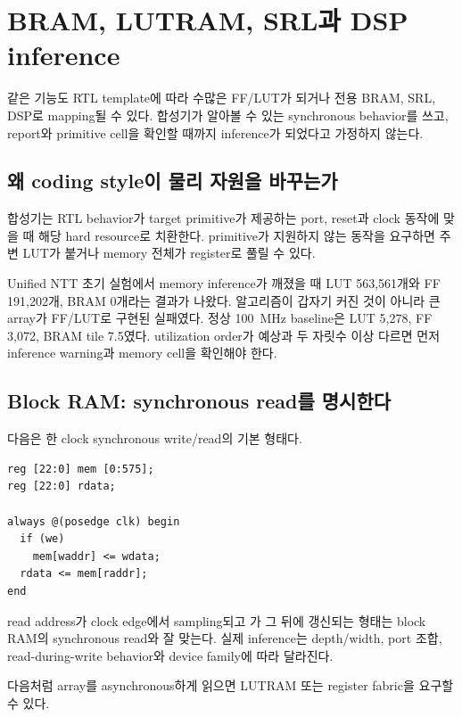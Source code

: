 \chapter{BRAM, LUTRAM, SRL과 DSP inference}

\begin{summarybox}[Inference의 의미]
같은 기능도 RTL template에 따라 수많은 FF/LUT가 되거나 전용 BRAM, SRL, DSP로
mapping될 수 있다. 합성기가 알아볼 수 있는 synchronous behavior를 쓰고, report와
primitive cell을 확인할 때까지 inference가 되었다고 가정하지 않는다.
\end{summarybox}

\section{왜 coding style이 물리 자원을 바꾸는가}

합성기는 RTL behavior가 target primitive가 제공하는 port, reset과 clock 동작에
맞을 때 해당 hard resource로 치환한다. primitive가 지원하지 않는 동작을 요구하면
주변 LUT가 붙거나 memory 전체가 register로 풀릴 수 있다.

Unified NTT 초기 실험에서 memory inference가 깨졌을 때 LUT 563,561개와 FF
191,202개, BRAM 0개라는 결과가 나왔다. 알고리즘이 갑자기 커진 것이 아니라 큰
array가 FF/LUT로 구현된 실패였다. 정상 100~MHz baseline은 LUT 5,278, FF 3,072,
BRAM tile 7.5였다. utilization order가 예상과 두 자릿수 이상 다르면 먼저
inference warning과 memory cell을 확인해야 한다.

\section{Block RAM: synchronous read를 명시한다}

다음은 한 clock synchronous write/read의 기본 형태다.

\begin{lstlisting}
reg [22:0] mem [0:575];
reg [22:0] rdata;

always @(posedge clk) begin
  if (we)
    mem[waddr] <= wdata;
  rdata <= mem[raddr];
end
\end{lstlisting}

read address가 clock edge에서 sampling되고 가 그 뒤에 갱신되는
형태는 block RAM의 synchronous read와 잘 맞는다. 실제 inference는 depth/width,
port 조합, read-during-write behavior와 device family에 따라 달라진다.

다음처럼 array를 asynchronous하게 읽으면 LUTRAM 또는 register fabric을 요구할
수 있다.

